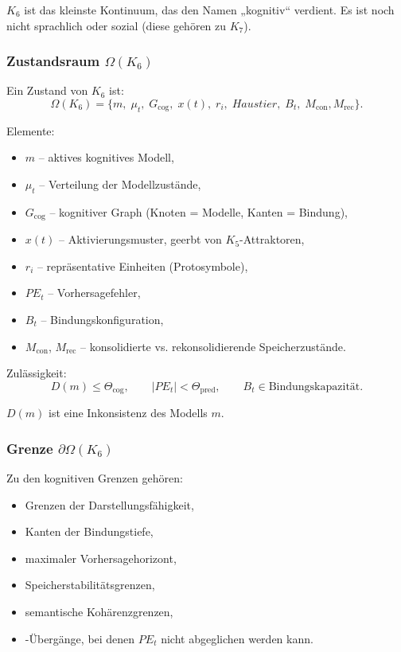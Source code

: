 $K_6$ ist das kleinste Kontinuum, das den Namen „kognitiv“ verdient. Es
ist noch nicht sprachlich oder sozial (diese gehören zu $K_7$).

\subsubsection{Zustandsraum \texorpdfstring{$\Omega(K_6)$}{\Omega(K_6)}}

Ein Zustand von $K_6$ ist:
\[
\Omega(K_6) =
\{
m,\; \mu_t,\; G_{\mathrm{cog}},\;
x(t),\; r_i,\;
Haustier,\; B_t,\;
M_{\mathrm{con}}, M_{\mathrm{rec}}
\}.
\]

Elemente:
\begin{itemize}
    \item $m$ – aktives kognitives Modell,
    \item $\mu_t$ – Verteilung der Modellzustände,
    \item $G_{\mathrm{cog}}$ – kognitiver Graph (Knoten = Modelle, Kanten = Bindung),
    \item $x(t)$ – Aktivierungsmuster, geerbt von $K_5$-Attraktoren,
    \item $r_i$ – repräsentative Einheiten (Protosymbole),
    \item $PE_t$ – Vorhersagefehler,
    \item $B_t$ – Bindungskonfiguration,
    \item $M_{\mathrm{con}}$, $M_{\mathrm{rec}}$ – konsolidierte vs. rekonsolidierende Speicherzustände.
\end{itemize}

Zulässigkeit:
\[
D(m) \le \Theta_{\mathrm{cog}}, \qquad
|PE_t| < \Theta_{\mathrm{pred}}, \qquad
B_t \in \text{Bindungskapazität}.
\]

$D(m)$ ist eine Inkonsistenz des Modells $m$.

\subsubsection{Grenze \texorpdfstring{$\partial\Omega(K_6)$}{\partial\Omega(K_6)}}

Zu den kognitiven Grenzen gehören:
\begin{itemize}
    \item Grenzen der Darstellungsfähigkeit,
    \item Kanten der Bindungstiefe,
    \item maximaler Vorhersagehorizont,
    \item Speicherstabilitätsgrenzen,
    \item semantische Kohärenzgrenzen,
    \item-Übergänge, bei denen $PE_t$ nicht abgeglichen werden kann.
\end{itemize}

